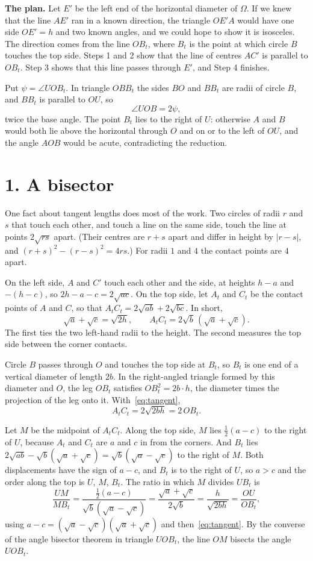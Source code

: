 \documentclass[11pt]{article}
\begin{document}
\textbf{The plan.} Let $E'$ be the left end of the horizontal diameter of $\Omega$. If we knew that the line $AE'$ ran in a known direction, the triangle $OE'A$ would have one side $OE'=h$ and two known angles, and we could hope to show it is isosceles. The direction comes from the line $OB_t$, where $B_t$ is the point at which circle $B$ touches the top side. Steps 1 and 2 show that the line of centres $AC'$ is parallel to $OB_t$. Step 3 shows that this line passes through $E'$, and Step 4 finishes.

Put $\psi=\angle UOB_t$. In triangle $OBB_t$ the sides $BO$ and $BB_t$ are radii of circle $B$, and $BB_t$ is parallel to $OU$, so
\[
\angle UOB=2\psi ,
\]
twice the base angle. The point $B_t$ lies to the right of $U$: otherwise $A$ and $B$ would both lie above the horizontal through $O$ and on or to the left of $OU$, and the angle $AOB$ would be acute, contradicting the reduction.

\section*{1. A bisector}

One fact about tangent lengths does most of the work. Two circles of radii $r$ and $s$ that touch each other, and touch a line on the same side, touch the line at points $2\sqrt{rs}$ apart. (Their centres are $r+s$ apart and differ in height by $|r-s|$, and $(r+s)^2-(r-s)^2=4rs$.) For radii $1$ and $4$ the contact points are $4$ apart.

On the left side, $A$ and $C'$ touch each other and the side, at heights $h-a$ and $-(h-c)$, so $2h-a-c=2\sqrt{ac}$. On the top side, let $A_t$ and $C_t$ be the contact points of $A$ and $C$, so that $A_tC_t=2\sqrt{ab}+2\sqrt{bc}$. In short,
\begin{equation}\label{eq:tangent}
\sqrt a+\sqrt c=\sqrt{2h},\qquad A_tC_t=2\sqrt b\,(\sqrt a+\sqrt c).
\end{equation}
The first ties the two left-hand radii to the height. The second measures the top side between the corner contacts.

Circle $B$ passes through $O$ and touches the top side at $B_t$, so $B_t$ is one end of a vertical diameter of length $2b$. In the right-angled triangle formed by this diameter and $O$, the leg $OB_t$ satisfies $OB_t^2=2b\cdot h$, the diameter times the projection of the leg onto it. With~\eqref{eq:tangent},
\[
A_tC_t=2\sqrt{2bh}=2\,OB_t .
\]

Let $M$ be the midpoint of $A_tC_t$. Along the top side, $M$ lies $\tfrac12(a-c)$ to the right of $U$, because $A_t$ and $C_t$ are $a$ and $c$ in from the corners. And $B_t$ lies $2\sqrt{ab}-\sqrt b(\sqrt a+\sqrt c)=\sqrt b(\sqrt a-\sqrt c)$ to the right of $M$. Both displacements have the sign of $a-c$, and $B_t$ is to the right of $U$, so $a>c$ and the order along the top is $U$, $M$, $B_t$. The ratio in which $M$ divides $UB_t$ is
\[
\frac{UM}{MB_t}=\frac{\tfrac12(a-c)}{\sqrt b(\sqrt a-\sqrt c)}=\frac{\sqrt a+\sqrt c}{2\sqrt b}=\frac{h}{\sqrt{2bh}}=\frac{OU}{OB_t},
\]
using $a-c=(\sqrt a-\sqrt c)(\sqrt a+\sqrt c)$ and then~\eqref{eq:tangent}. By the converse of the angle bisector theorem in triangle $UOB_t$, the line $OM$ bisects the angle $UOB_t$.
\end{document}
